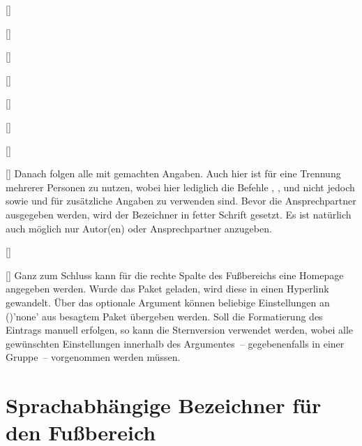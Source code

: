 \begin{Bundle*}[v2.05]{}
\begin{Declaration}{[]}
\begin{Declaration}{[]}
\begin{Declaration}{[]}
\begin{Declaration}{[]}
\begin{Declaration}{[]}
\begin{Declaration}{[]}
\begin{Declaration}{[]}
\begin{Declaration}{[]}
Danach folgen alle mit  gemachten Angaben. Auch hier ist 
 für eine Trennung mehrerer Personen zu nutzen, wobei hier lediglich 
die Befehle , ,  und 
 nicht jedoch  sowie  und 
 für zusätzliche Angaben zu verwenden sind. Bevor die 
Ansprechpartner ausgegeben werden, wird der Bezeichner  
in fetter Schrift gesetzt. Es ist natürlich auch möglich nur Autor(en) oder 
Ansprechpartner anzugeben.
\end{Declaration}
\end{Declaration}
\end{Declaration}
\end{Declaration}
\end{Declaration}
\end{Declaration}
\end{Declaration}
\end{Declaration}

\begin{Declaration}{[]}
\begin{Declaration}{[]}
\printdeclarationlist%
%
Ganz zum Schluss kann für die rechte Spalte des Fußbereichs eine Homepage 
angegeben werden. Wurde das Paket  geladen, wird diese in 
einen Hyperlink gewandelt. Über das optionale Argument können beliebige 
Einstellungen an ()'none' aus besagtem 
Paket übergeben werden. Soll die Formatierung des Eintrags manuell erfolgen, so 
kann die Sternversion  verwendet werden, wobei alle gewünschten 
Einstellungen innerhalb des Argumentes~-- gegebenenfalls in einer Gruppe~-- 
vorgenommen werden müssen.
\end{Declaration}
\end{Declaration}



\section{Sprachabhängige Bezeichner für den Fußbereich}


\end{Bundle*}
